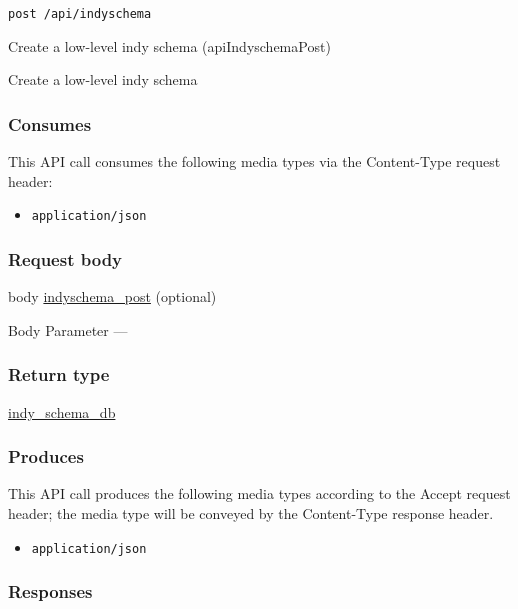 \begin{verbatim}
post /api/indyschema
\end{verbatim}

Create a low-level indy schema ({apiIndyschemaPost})

Create a low-level indy schema

\hypertarget{consumes-14}{%
\subsubsection{Consumes}\label{consumes-14}}

This API call consumes the following media types via the {Content-Type}
request header:

\begin{itemize}
\tightlist
\item
  \texttt{application/json}
\end{itemize}

\hypertarget{request-body-14}{%
\subsubsection{Request body}\label{request-body-14}}

body \protect\hyperlink{indyschema_post}{indyschema\_post} (optional)

{Body Parameter} ---

\hypertarget{return-type-35}{%
\subsubsection{Return type}\label{return-type-35}}

\protect\hyperlink{indy_schema_db}{indy\_schema\_db}

\hypertarget{produces-44}{%
\subsubsection{Produces}\label{produces-44}}

This API call produces the following media types according to the
{Accept} request header; the media type will be conveyed by the
{Content-Type} response header.

\begin{itemize}
\tightlist
\item
  \texttt{application/json}
\end{itemize}

\hypertarget{responses-44}{%
\subsubsection{Responses}\label{responses-44}}

